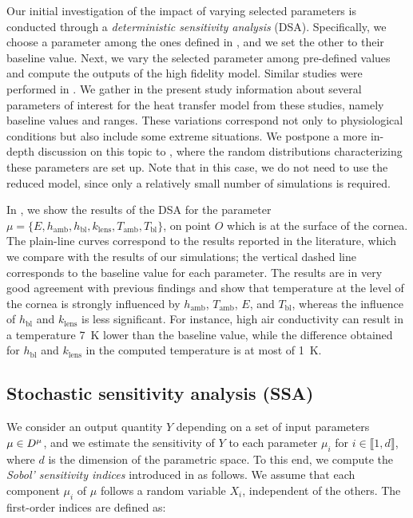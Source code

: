 Our initial investigation of the impact of varying selected parameters is conducted through a \emph{deterministic sensitivity analysis} (DSA).
Specifically, we choose a parameter among the ones defined in , and we set the other to their baseline value.
Next, we vary the selected parameter among pre-defined values and compute the outputs of the high fidelity model.
Similar studies were performed in \cite{Scott_1988, NG2006268, li2010}.
We gather in the present study information about several parameters of interest for the heat transfer model from these studies,
namely baseline values and ranges.
These variations correspond not only to physiological conditions but also include some extreme situations.
We postpone a more in-depth discussion on this topic to , where the random distributions characterizing these parameters are set up.
Note that in this case, we do not need to use the reduced model, since only a relatively small number of simulations is required.

In , we show the results of the DSA for the parameter $\mu=\{E, h_\text{amb}, h_\text{bl}, k_\text{lens}, T_\text{amb}, T_\text{bl}\}$, on point $O$ which is at the surface of the cornea.
The plain-line curves correspond to the results reported in the literature, which we compare with the results of our simulations;
the vertical dashed line corresponds to the baseline value for each parameter.
The results are in very good agreement with previous findings and show that temperature at the level of the cornea is strongly influenced by  $h_\text{amb}$, $T_\text{amb}$, $E$, and $T_\text{bl}$,
whereas the influence of $h_\text{bl}$ and $k_\text{lens}$ is less significant.
For instance, high air conductivity can result in a temperature \qty{7}{\kelvin} lower than the baseline value,
while the difference obtained for $h_\text{bl}$ and $k_\text{lens}$ in the computed temperature is at most of \qty{1}{\kelvin}.






\subsection[Stochastic sensitivity analysis]{Stochastic sensitivity analysis (SSA)}
\label{sec:SSA}

We consider an output quantity $Y$ depending on a set of input parameters $\mu\in D^{\mu}$,
and we estimate the sensitivity of $Y$ to each parameter $\mu_i$ for $i\in\llbracket 1,d\rrbracket$, where $d$ is the dimension of the parametric space.
To this end, we compute the \emph{Sobol' sensitivity indices} introduced in \cite{Sobol1993SensitivityEF} as follows.
We assume that each component $\mu_i$ of $\mu$ follows a random variable $X_i$, independent of the others.
The first-order indices are defined as:

